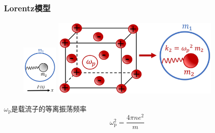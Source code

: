 {%
%
\frame
{
	\frametitle{\textrm{Lorentz}模型}
\begin{figure}[h!]
\centering
\vspace*{-5pt}
\includegraphics[height=1.05in,width=0.7in,viewport=0 0 380 550,clip]{Figures/A_mechanical_model_giving_rise_to_the_negative_effective_mass_effect.jpg}
\includegraphics[height=1.55in,width=3.25in,viewport=0 0 1300 600,clip]{Figures/Equivalent_mechanical_scheme_of_electron_gas_in_ionic_lattice.jpg}
\caption{\fontsize{5.5pt}{4.2pt}}%
\label{Electron-gas-in-lattice}
\end{figure} 
			$\omega_{\mathrm{p}}$是载流子的等离振荡频率
			\begin{displaymath}
				\omega_{\mathrm{p}}^2=\frac{4\pi ne^2}m
			\end{displaymath}
}

}
